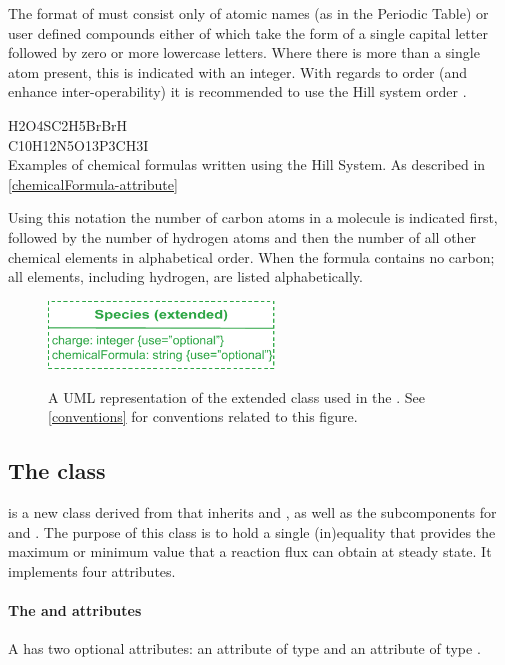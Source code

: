 The format of  must consist only of atomic names (as in the Periodic Table) or user defined compounds either of which take the form of a single capital letter followed by zero or more lowercase letters. Where there is more than a single atom present, this is indicated with an integer. With regards to order (and enhance inter-operability) it is recommended to use the Hill system order \cite{hillsystem, hillwikipedia}.
%
\begin{table}[h!]
  H2O4S\qquad C2H5Br\qquad BrH\\
  C10H12N5O13P3\qquad CH3I\\
  \caption{Examples of chemical formulas written using the Hill System. As described in \ref{chemicalFormula-attribute}}\label{table:hill}
\end{table}
%
Using this notation the number of carbon atoms in a molecule is indicated first, followed by the number of hydrogen atoms and then the number of all other chemical elements in alphabetical order. When the formula contains no carbon; all elements, including hydrogen, are listed alphabetically.
%
\begin{figure}[h!]
  \centering
  \includegraphics[width=6cm]{images/fbc_uml_species.pdf}\\
  \caption{A UML representation of the extended \SBML \Species class used in
  the \FBCPackage. See \ref{conventions} for conventions related to this
  figure.}
  \label{fig:fbc_uml_species}
\end{figure}

\newpage
\subsection{The \FBC {} class}
\label{fluxbound-class}

\FluxBound is a new \FBC class derived from \SBML \SBase that inherits
 and , as well as the subcomponents for
\Annotation and \Notes. The purpose of this class is to hold a single
(in)equality that provides the maximum or minimum value that a reaction flux
can obtain at steady state. It implements four attributes.

\paragraph{The  and  attributes}
A \FluxBound has two optional attributes:  an attribute of type
 and  an attribute of type .

